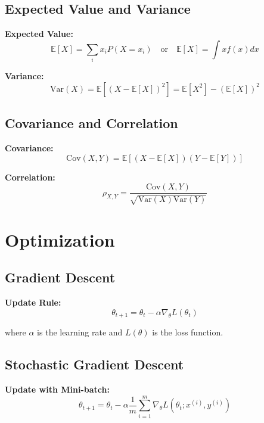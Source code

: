 \subsection{Expected Value and Variance}

\textbf{Expected Value:}
\begin{equation}
\mathbb{E}[X] = \sum_{i} x_i P(X=x_i) \quad \text{or} \quad \mathbb{E}[X] = \int x f(x) dx
\end{equation}

\textbf{Variance:}
\begin{equation}
\text{Var}(X) = \mathbb{E}[(X - \mathbb{E}[X])^2] = \mathbb{E}[X^2] - (\mathbb{E}[X])^2
\end{equation}

\subsection{Covariance and Correlation}

\textbf{Covariance:}
\begin{equation}
\text{Cov}(X,Y) = \mathbb{E}[(X - \mathbb{E}[X])(Y - \mathbb{E}[Y])]
\end{equation}

\textbf{Correlation:}
\begin{equation}
\rho_{X,Y} = \frac{\text{Cov}(X,Y)}{\sqrt{\text{Var}(X)\text{Var}(Y)}}
\end{equation}

\section{Optimization}

\subsection{Gradient Descent}

\textbf{Update Rule:}
\begin{equation}
\theta_{t+1} = \theta_t - \alpha \nabla_\theta L(\theta_t)
\end{equation}

where $\alpha$ is the learning rate and $L(\theta)$ is the loss function.

\subsection{Stochastic Gradient Descent}

\textbf{Update with Mini-batch:}
\begin{equation}
\theta_{t+1} = \theta_t - \alpha \frac{1}{m}\sum_{i=1}^{m} \nabla_\theta L(\theta_t; x^{(i)}, y^{(i)})
\end{equation}

